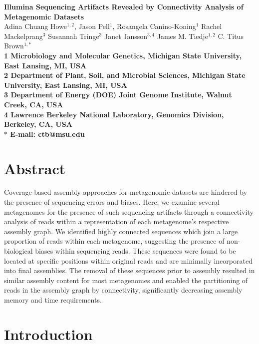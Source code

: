 \documentclass[10pt]{article}
\date{}
\begin{document}
\begin{flushleft}
{\Large \textbf{Illumina Sequencing Artifacts Revealed by Connectivity
    Analysis of Metagenomic Datasets} }
\\
Adina Chuang Howe$^{1,2}$, 
Jason Pell$^{1}$,
Rosangela Canino-Koning$^{1}$
Rachel Mackelprang$^{3}$
Susannah Tringe$^{3}$
Janet Jansson$^{3,4}$ 
James M. Tiedje$^{1,2}$
C. Titus Brown$^{1,\ast}$
\\
\bf{1} Microbiology and Molecular Genetics, Michigan State University, East Lansing, MI, USA
\\
\bf{2} Department of Plant, Soil, and Microbial Sciences, Michigan State University, East Lansing, MI, USA
\\
\bf{3} Department of Energy (DOE) Joint Genome Institute, Walnut Creek, CA, USA
\\
\bf{4} Lawrence Berkeley National Laboratory, Genomics Division, Berkeley, CA, USA
\\
$\ast$ E-mail: ctb@msu.edu
\end{flushleft}

\section*{Abstract}

Coverage-based assembly approaches for metagenomic datasets are
hindered by the presence of sequencing errors and biases.  Here, we
examine several metagenomes for the presence of such sequencing
artifacts through a connectivity analysis of reads within a
representation of each metagenome's respective assembly graph.  We
identified highly connected sequences which join a large proportion of
reads within each metagenome, suggesting the presence of
non-biological biases within sequencing reads.  These sequences were
found to be located at specific positions within original reads and
are minimally incorporated into final assemblies.  The removal of
these sequences prior to assembly resulted in similar assembly content
for most metagenomes and enabled the partitioning of reads in the
assembly graph by connectivity, significantly decreasing assembly
memory and time requirements.


\section*{Introduction}
\end{document}
